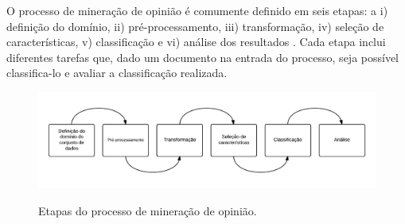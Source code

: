 

%
%

O processo de mineração de opinião é comumente definido em seis etapas: a i) definição do domínio, ii) pré-processamento, iii) transformação, iv) seleção de características, v) classificação e vi) análise dos resultados \cite{moraes2012document}. Cada etapa inclui diferentes tarefas que, dado um documento na entrada do processo, seja possível classifica-lo e avaliar a classificação realizada.

\begin{figure}[h]
\caption{Etapas do processo de mineração de opinião.}
\centering
\includegraphics[scale=0.35]{opinion_mining_process.png}
\label{figura:processo_mineracao}
\end{figure}

